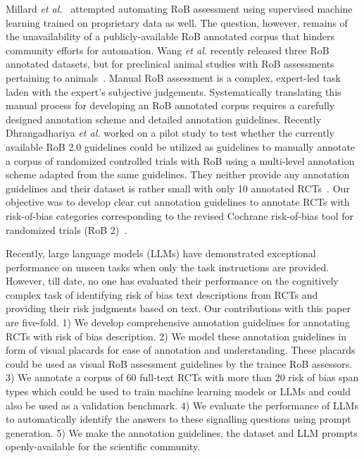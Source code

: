 \documentclass[sn-mathphys,Numbered]{sn-jnl}%
\theoremstyle{thmstyleone}%
\theoremstyle{thmstyletwo}%
\theoremstyle{thmstylethree}%
\begin{document}
Millard \textit{et al.}~\cite{millard2016machine} attempted automating RoB assessment using supervised machine learning trained on proprietary data as well.
The question, however, remains of the unavailability of a publicly-available RoB annotated corpus that hinders community efforts for automation. 
Wang \textit{et al.} recently released three RoB annotated datasets, but for preclinical animal studies with RoB assessments pertaining to animals~\cite{wang2022risk}.
Manual RoB assessment is a complex, expert-led task laden with the expert's subjective judgements.
Systematically translating this manual process for developing an RoB annotated corpus requires a carefully designed annotation scheme and detailed annotation guidelines.
Recently Dhrangadhariya \textit{et al.} worked on a pilot study to test whether the currently available RoB 2.0 guidelines could be utilized as guidelines to manually annotate a corpus of randomized controlled trials with RoB using a multi-level annotation scheme adapted from the same guidelines.
They neither provide any annotation guidelines and their dataset is rather small with only 10 annotated RCTs~\cite{dhrangadhariya2023first}.
Our objective was to develop clear cut annotation guidelines to annotate RCTs with risk-of-bias categories corresponding to the revised Cochrane risk-of-bias tool for randomized trials (RoB 2)~\cite{sterne2019rob}.



Recently, large language models (LLMs) have demonstrated exceptional performance on unseen tasks when only the task instructions are provided.
However, till date, no one has evaluated their performance on the cognitively complex task of identifying risk of bias text descriptions from RCTs and providing their risk judgments based on text.
Our contributions with this paper are five-fold. 
1) We develop comprehensive annotation guidelines for annotating RCTs with risk of bias description.
2) We model these annotation guidelines in form of visual placards for ease of annotation and understanding. These placards could be used as visual RoB assessment guidelines by the trainee RoB assessors.
3) We annotate a corpus of 60 full-text RCTs with more than 20 risk of bias span types which could be used to train machine learning models or LLMs and could also be used as a validation benchmark.
4) We evaluate the performance of LLMs to automatically identify the answers to these signalling questions using prompt generation.
5) We make the annotation guidelines, the dataset and LLM prompts openly-available for the scientific community.
%
%
%
\end{document}
